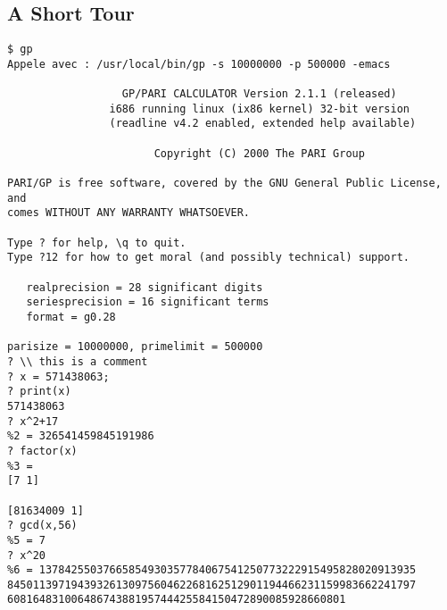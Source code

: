 \documentclass[11pt]{report}
\begin{document}
\subsection{A Short Tour}
\begin{verbatim}
$ gp
Appele avec : /usr/local/bin/gp -s 10000000 -p 500000 -emacs

                  GP/PARI CALCULATOR Version 2.1.1 (released)
                i686 running linux (ix86 kernel) 32-bit version
                (readline v4.2 enabled, extended help available)

                       Copyright (C) 2000 The PARI Group

PARI/GP is free software, covered by the GNU General Public License, and 
comes WITHOUT ANY WARRANTY WHATSOEVER.

Type ? for help, \q to quit.
Type ?12 for how to get moral (and possibly technical) support.

   realprecision = 28 significant digits
   seriesprecision = 16 significant terms
   format = g0.28

parisize = 10000000, primelimit = 500000
? \\ this is a comment
? x = 571438063;
? print(x)
571438063
? x^2+17
%2 = 326541459845191986
? factor(x)
%3 = 
[7 1]

[81634009 1]
? gcd(x,56)
%5 = 7
? x^20
%6 = 13784255037665854930357784067541250773222915495828020913935
8450113971943932613097560462268162512901194466231159983662241797
60816483100648674388195744425584150472890085928660801

\end{verbatim}
\end{document}

